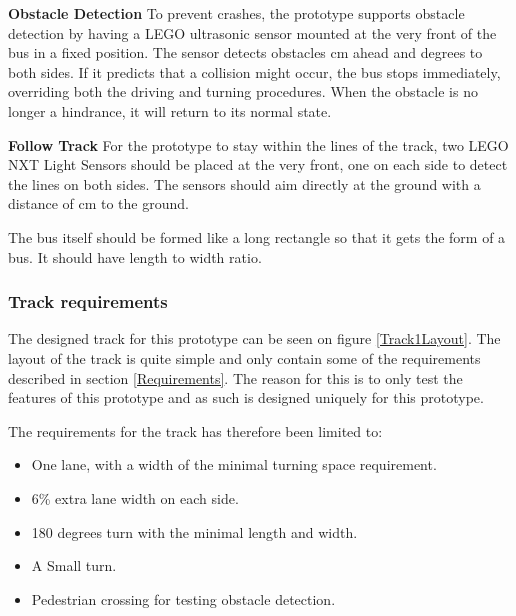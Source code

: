 \textbf{Obstacle Detection}\newline
To prevent crashes, the prototype supports obstacle detection by having a LEGO ultrasonic sensor mounted at the very front of the bus in a fixed position. The sensor detects obstacles  cm ahead and  degrees to both sides. If it predicts that a collision might occur, the bus stops immediately, overriding both the driving and turning procedures. When the obstacle is no longer a hindrance, it will return to its normal state.  %

\textbf{Follow Track}\newline
For the prototype to stay within the lines of the track, two LEGO NXT Light Sensors should be placed at the very front, one on each side to detect the lines on both sides. The sensors should aim directly at the ground with a distance of  cm to the ground. 

The bus itself should be formed like a long rectangle so that it gets the form of a bus. It should have  length to width ratio.

\subsubsection{Track requirements}
The designed track for this prototype can be seen on figure \ref{Track1Layout}. The layout of the track is quite simple and only contain some of the requirements described in section \ref{Requirements}. The reason for this is to only test the features of this prototype and as such is designed uniquely for this prototype.

The requirements for the track has therefore been limited to:
\cite{DriveingCurves}
\begin{itemize}
  \item One lane, with a width of the minimal turning space requirement.
  \item 6\% extra lane width on each side.
  \item 180 degrees turn with the minimal length and width.
  \item A Small turn.
  \item Pedestrian crossing for testing obstacle detection.
\end{itemize}


